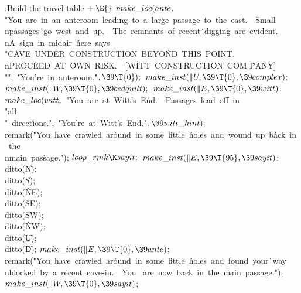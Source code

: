 \Y\B\4:Build the travel table\X${}\mathrel+\E{}$\6
$\\{make\_loc}(\\{ante},{}$\6
\.{"You\ are\ in\ an\ anter}\)\.{oom\ leading\ to\ a\ lar}\)\.{ge\ passage\ to\
the\ ea}\)\.{st.\ \ Small\\npassages}\)\.{\ go\ west\ and\ up.\ \ Th}\)\.{e\
remnants\ of\ recent}\)\.{\ digging\ are\ evident}\)\.{.\\nA\ sign\ in\ midair\
}\)\.{here\ says\ \\"CAVE\ UND}\)\.{ER\ CONSTRUCTION\ BEYO}\)\.{ND\ THIS\
POINT.\\nPROC}\)\.{EED\ AT\ OWN\ RISK.\ \ [W}\)\.{ITT\ CONSTRUCTION\ COM}\)%
\.{PANY]\\""}${},{}$\6
\.{"You're\ in\ anteroom.}\)\.{"}${},\39\T{0});{}$\6
${}\\{make\_inst}(\|U,\39\T{0},\39\\{complex});{}$\6
${}\\{make\_inst}(\|W,\39\T{0},\39\\{bedquilt});{}$\6
${}\\{make\_inst}(\|E,\39\T{0},\39\\{witt}){}$;\7
${}\\{make\_loc}(\\{witt},{}$\6
\.{"You\ are\ at\ Witt's\ E}\)\.{nd.\ \ Passages\ lead\ o}\)\.{ff\ in\ \\"all%
\\"\ direct}\)\.{ions."}${},{}$\6
\.{"You're\ at\ Witt's\ En}\)\.{d."}${},\39\\{witt\_hint});{}$\6
\\{remark}(\.{"You\ have\ crawled\ ar}\)\.{ound\ in\ some\ little\ }\)\.{holes\
and\ wound\ up\ b}\)\.{ack\ in\ the\\nmain\ pas}\)\.{sage."});\6
${}\\{loop\_rmk}\K\\{sayit};{}$\6
${}\\{make\_inst}(\|E,\39\T{95},\39\\{sayit}){}$;\5
\\{ditto}(\|N);\5
\\{ditto}(\|S);\6
\\{ditto}(\.{NE});\5
\\{ditto}(\.{SE});\5
\\{ditto}(\.{SW});\5
\\{ditto}(\.{NW});\5
\\{ditto}(\|U);\5
\\{ditto}(\|D);\6
${}\\{make\_inst}(\|E,\39\T{0},\39\\{ante}){}$;\6
\\{remark}(\.{"You\ have\ crawled\ ar}\)\.{ound\ in\ some\ little\ }\)\.{holes\
and\ found\ your}\)\.{\ way\\nblocked\ by\ a\ r}\)\.{ecent\ cave-in.\ \ You\ }%
\)\.{are\ now\ back\ in\ the\ }\)\.{main\ passage."});\6
${}\\{make\_inst}(\|W,\39\T{0},\39\\{sayit}){}$;\par
\fi


